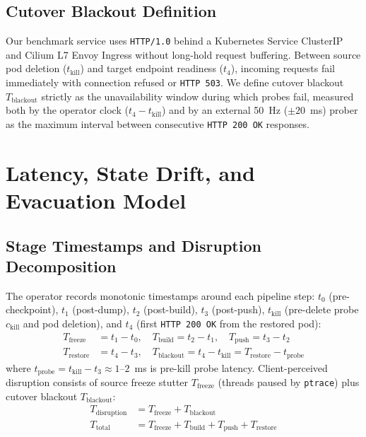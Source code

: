 \documentclass[conference,10pt]{IEEEtran}
\begin{document}
\subsection{Cutover Blackout Definition}
Our benchmark service uses \texttt{HTTP/1.0} behind a Kubernetes Service ClusterIP and Cilium L7 Envoy Ingress without long-hold request buffering. Between source pod deletion ($t_{\text{kill}}$) and target endpoint readiness ($t_4$), incoming requests fail immediately with connection refused or \texttt{HTTP 503}. We define cutover blackout $T_{\text{blackout}}$ strictly as the unavailability window during which probes fail, measured both by the operator clock ($t_4 - t_{\text{kill}}$) and by an external 50~Hz ($\pm 20$~ms) prober as the maximum interval between consecutive \texttt{HTTP 200 OK} responses.

\section{Latency, State Drift, and Evacuation Model}

\subsection{Stage Timestamps and Disruption Decomposition}
The operator records monotonic timestamps around each pipeline step: $t_0$ (pre-checkpoint), $t_1$ (post-dump), $t_2$ (post-build), $t_3$ (post-push), $t_{\text{kill}}$ (pre-delete probe $c_{\text{kill}}$ and pod deletion), and $t_4$ (first \texttt{HTTP 200 OK} from the restored pod):
\begin{align}
T_{\text{freeze}} &= t_1 - t_0, \quad T_{\text{build}} = t_2 - t_1, \quad T_{\text{push}} = t_3 - t_2 \\
T_{\text{restore}} &= t_4 - t_3, \quad T_{\text{blackout}} = t_4 - t_{\text{kill}} = T_{\text{restore}} - t_{\text{probe}}
\end{align}
where $t_{\text{probe}} = t_{\text{kill}} - t_3 \approx 1$--$2$~ms is pre-kill probe latency. Client-perceived disruption consists of source freeze stutter $T_{\text{freeze}}$ (threads paused by \texttt{ptrace}) plus cutover blackout $T_{\text{blackout}}$:
\begin{align}
T_{\text{disruption}} &= T_{\text{freeze}} + T_{\text{blackout}} \\
T_{\text{total}} &= T_{\text{freeze}} + T_{\text{build}} + T_{\text{push}} + T_{\text{restore}}
\end{align}
\end{document}

